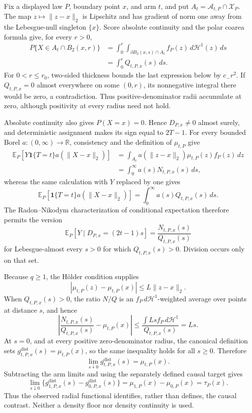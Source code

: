Fix a displayed law \(P\), boundary point \(x\), and arm \(t\), and put \(A_t=\mathcal A_{t,P}\cap\mathcal X_P\).  The map \(z\mapsto\lVert z-x\rVert_2\) is Lipschitz and has gradient of norm one away from the Lebesgue-null singleton \(\{x\}\).  Score absolute continuity and the polar coarea formula give, for every \(r>0\),
\[
\begin{aligned}
 P\{X\in A_t\cap B_2(x,r)\}
 &=\int_0^r\int_{\partial B_2(x,s)\cap A_t}
 f_P(z)\,d\mathcal H^1(z)\,ds\\
 &=\int_0^rQ_{t,P,x}(s)\,ds.
\end{aligned}
\]
For \(0<r\leq r_0\), two-sided thickness bounds the last expression below by \(c_-r^2\).  If \(Q_{t,P,x}=0\) almost everywhere on some \((0,r)\), its nonnegative integral there would be zero, a contradiction.  Thus positive-denominator radii accumulate at zero, although positivity at every radius need not hold.

Absolute continuity also gives \(P(X=x)=0\).  Hence \(D_{P,x}\neq0\) almost surely, and deterministic assignment makes its sign equal to \(2T-1\).  For every bounded Borel \(a:(0,\infty)\to\mathbb R\), consistency and the definition of \(\mu_{t,P}\) give
\[
\begin{aligned}
 \mathbb E_P\!\left[Y\mathbf1\{T=t\}a(\lVert X-x\rVert_2)\right]
 &=\int_{A_t}a(\lVert z-x\rVert_2)\mu_{t,P}(z)f_P(z)\,dz\\
 &=\int_0^\infty a(s)N_{t,P,x}(s)\,ds,
\end{aligned}
\]
whereas the same calculation with \(Y\) replaced by one gives
\[
 \mathbb E_P\!\left[\mathbf1\{T=t\}a(\lVert X-x\rVert_2)\right]
 =\int_0^\infty a(s)Q_{t,P,x}(s)\,ds.
\]
The Radon--Nikodym characterization of conditional expectation therefore permits the version
\[
 \mathbb E_P[Y\mid D_{P,x}=(2t-1)s]
 =\frac{N_{t,P,x}(s)}{Q_{t,P,x}(s)}
\]
for Lebesgue-almost every \(s>0\) for which \(Q_{t,P,x}(s)>0\).  Division occurs only on that set.

Because \(q\geq1\), the H\"older condition supplies
\[
 |\mu_{t,P}(z)-\mu_{t,P}(x)|\leq L\lVert z-x\rVert_2.
\]
When \(Q_{t,P,x}(s)>0\), the ratio \(N/Q\) is an \(f_P\,d\mathcal H^1\)-weighted average over points at distance \(s\), and hence
\[
 \left|\frac{N_{t,P,x}(s)}{Q_{t,P,x}(s)}-\mu_{t,P}(x)\right|
 \leq\frac{\int Ls f_P\,d\mathcal H^1}{Q_{t,P,x}(s)}=Ls.
\]
At \(s=0\), and at every positive zero-denominator radius, the canonical definition sets \(g^{\mathrm{dist}}_{t,P,x}(s)=\mu_{t,P}(x)\), so the same inequality holds for all \(s\geq0\).  Therefore
\[
 \lim_{s\downarrow0}g^{\mathrm{dist}}_{t,P,x}(s)=\mu_{t,P}(x).
\]
Subtracting the arm limits and using the separately defined causal target gives
\[
 \lim_{s\downarrow0}\{g^{\mathrm{dist}}_{1,P,x}(s)-g^{\mathrm{dist}}_{0,P,x}(s)\}
 =\mu_{1,P}(x)-\mu_{0,P}(x)=\tau_P(x).
\]
Thus the observed radial functional identifies, rather than defines, the causal contrast.  Neither a density floor nor density continuity is used.